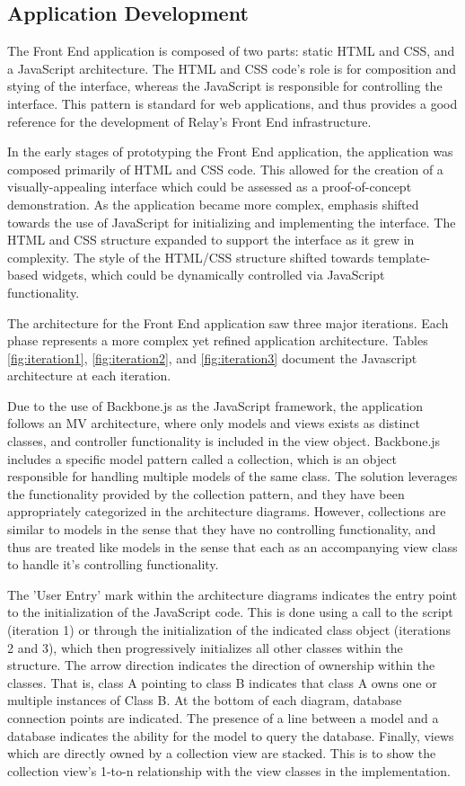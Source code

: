 \documentclass{report}
\begin{document}
\subsection{Application Development}

The Front End application is composed of two parts: static HTML and CSS, and a JavaScript architecture. The HTML and CSS code's role is for composition and stying of the interface, whereas the JavaScript is responsible for controlling the interface. This pattern is standard for web applications, and thus provides a good reference for the development of Relay's Front End infrastructure.

In the early stages of prototyping the Front End application, the application was composed primarily of HTML and CSS code. This allowed for the creation of a visually-appealing interface which could be assessed as a proof-of-concept demonstration. As the application became more complex, emphasis shifted towards the use of JavaScript for initializing and implementing the interface. The HTML and CSS structure expanded to support the interface as it grew in complexity. The style of the HTML/CSS structure shifted towards template-based widgets, which could be dynamically controlled via JavaScript functionality.

The architecture for the Front End application saw three major iterations. Each phase represents a more complex yet refined application architecture. Tables \ref{fig:iteration1}, \ref{fig:iteration2}, and \ref{fig:iteration3} document the Javascript architecture at each iteration.

Due to the use of Backbone.js as the JavaScript framework, the application follows an MV architecture, where only models and views exists as distinct classes, and controller functionality is included in the view object. Backbone.js includes a specific model pattern called a collection, which is an object responsible for handling multiple models of the same class. The solution leverages the functionality provided by the collection pattern, and they have been appropriately categorized in the architecture diagrams. However, collections are similar to models in the sense that they have no controlling functionality, and thus are treated like models in the sense that each as an accompanying view class to handle it's controlling functionality.

The 'User Entry' mark within the architecture diagrams indicates the entry point to the initialization of the JavaScript code. This is done using a call to the script (iteration 1) or through the initialization of the indicated class object (iterations 2 and 3), which then progressively initializes all other classes within the structure. The arrow direction indicates the direction of ownership within the classes. That is, class A pointing to class B indicates that class A owns one or multiple instances of Class B. At the bottom of each diagram, database connection points are indicated. The presence of a line between a model and a database indicates the ability for the model to query the database. Finally, views which are directly owned by a collection view are stacked. This is to show the collection view's 1-to-n relationship with the view classes in the implementation.
\end{document}
